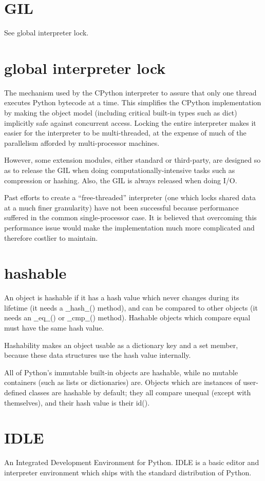 \documentclass[12pt,a4paper,final,twoside,onecolumn,titlepage]{book}
\begin{document}
\section{GIL}
See global interpreter lock.

\section{global interpreter lock}
The mechanism used by the CPython interpreter to assure that only one thread executes Python bytecode at a time. This simplifies the CPython implementation by making the object model (including critical built-in types such as dict) implicitly safe against concurrent access. Locking the entire interpreter makes it easier for the interpreter to be multi-threaded, at the expense of much of the parallelism afforded by multi-processor machines.

However, some extension modules, either standard or third-party, are designed so as to release the GIL when doing computationally-intensive tasks such as compression or hashing. Also, the GIL is always released when doing I/O.

Past efforts to create a “free-threaded” interpreter (one which locks shared data at a much finer granularity) have not been successful because performance suffered in the common single-processor case. It is believed that overcoming this performance issue would make the implementation much more complicated and therefore costlier to maintain.

\section{hashable}
An object is hashable if it has a hash value which never changes during its lifetime (it needs a $\_\_$hash$\_\_$() method), and can be compared to other objects (it needs an $\_\_$eq$\_\_$() or $\_\_$cmp$\_\_$() method). Hashable objects which compare equal must have the same hash value.

Hashability makes an object usable as a dictionary key and a set member, because these data structures use the hash value internally.

All of Python’s immutable built-in objects are hashable, while no mutable containers (such as lists or dictionaries) are. Objects which are instances of user-defined classes are hashable by default; they all compare unequal (except with themselves), and their hash value is their id().

\section{IDLE}
An Integrated Development Environment for Python. IDLE is a basic editor and interpreter environment which ships with the standard distribution of Python.
\end{document}
